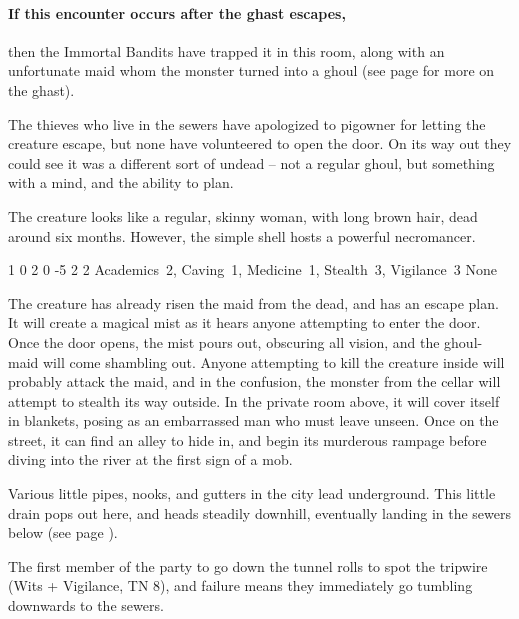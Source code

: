 \begin{multicols}{2}
\paragraph{If this encounter occurs after the ghast escapes,}
then the Immortal Bandits have trapped it in this room, along with an unfortunate maid whom the monster turned into a ghoul (see page \pageref{ghastEscape} for more on the ghast).

The thieves who live in the sewers have apologized to \gls{pigowner} for letting the creature escape, but none have volunteered to open the door.
On its way out they could see it was a different sort of undead -- not a regular ghoul, but something with a mind, and the ability to plan.

The creature looks like a regular, skinny woman, with long brown hair, dead around six months.
However, the simple shell hosts a powerful necromancer.


  {1}%
  {0}%
  {{2}%
  {0}%
  {-5}}%
  {2}%
  {2}%
  {Academics~2, Caving~1, Medicine~1, Stealth~3, Vigilance~3
  }%
  {None}%
  {}

The creature has already risen the maid from the dead, and has an escape plan.
It will create a magical mist as it hears anyone attempting to enter the door.
Once the door opens, the mist pours out, obscuring all vision, and the ghoul-maid will come shambling out.
Anyone attempting to kill the creature inside will probably attack the maid, and in the confusion, the monster from the cellar will attempt to stealth its way outside.
In the private room above, it will cover itself in blankets, posing as an embarrassed man who must leave unseen.
Once on the street, it can find an alley to hide in, and begin its murderous rampage before diving into the river at the first sign of a mob.


\label{runoff}

Various little pipes, nooks, and gutters in the city lead underground.
This little drain pops out here, and heads steadily downhill, eventually landing in the sewers below (see page \pageref{slidein}).

The first member of the party to go down the tunnel rolls to spot the tripwire (Wits + Vigilance, TN 8), and failure means they immediately go tumbling downwards to the sewers.


\end{multicols}
